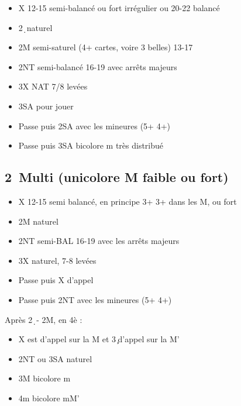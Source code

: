 \documentclass[a4paper]{article}
\begin{document}
\begin{itemize}
\item X 12-15 semi-balancé ou fort irrégulier ou 20-22 balancé

\item 2\d\ naturel

\item 2M semi-saturel (4+ cartes, voire 3 belles) 13-17

\item 2NT semi-balancé 16-19 avec arrêts majeurs

\item 3X NAT 7/8 levées

\item 3SA pour jouer

\item Passe puis 2SA avec les mineures (5+ 4+)

\item Passe puis 3SA bicolore m très distribué

\end{itemize}

\subsection{2\pdfd\ Multi (unicolore M faible ou fort)}

\begin{itemize}
\item X 12-15 semi balancé, en principe 3+ 3+ dans les M, ou fort

\item 2M naturel

\item 2NT semi-BAL 16-19 avec les arrêts majeurs

\item 3X naturel, 7-8 levées

\item Passe puis X d'appel

\item Passe puis 2NT avec les mineures (5+ 4+)

\end{itemize}

Après 2\d\ - 2M, en 4è :

\begin{itemize}
\item X est d'appel sur la M et 3\c\ d'appel sur la M'

\item 2NT ou 3SA naturel

\item 3M bicolore m 

\item 4m bicolore mM'

\end{itemize}
\end{document}
